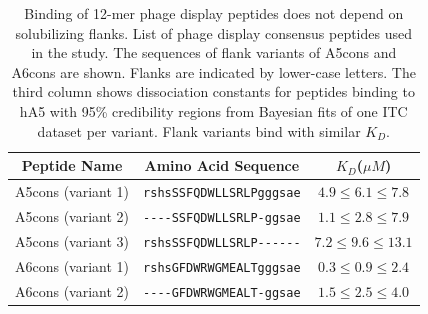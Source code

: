 \begin{table}[h!]\footnotesize
\centering
\caption[Binding of 12-mer phage display peptides
does not depend\newline on solubilizing flanks] {Binding of 12-mer phage display peptides
does not depend on solubilizing flanks. List of phage display consensus
peptides used in the study. The sequences of flank variants of A5cons
and A6cons are shown. Flanks are indicated by lower-case letters.
The third column shows dissociation constants for peptides binding
to hA5 with 95\% credibility regions from Bayesian fits of one ITC
dataset per variant. Flank variants bind with similar $K_{D}$.}


\begin{tabular}{ccc}
Peptide Name & Amino Acid Sequence & $K_{D}$($\mu M$)\tabularnewline
\hline 
A5cons (variant 1) & \texttt{rshsSSFQDWLLSRLPgggsae} & $4.9\le6.1\le7.8$\tabularnewline
A5cons (variant 2) & \texttt{-{}-{}-{}-SSFQDWLLSRLP-ggsae} & $1.1\le2.8\le7.9$\tabularnewline
A5cons (variant 3) & \texttt{rshsSSFQDWLLSRLP-{}-{}-{}-{}-{}-} & $7.2\le9.6\le13.1$\tabularnewline
A6cons (variant 1) & \texttt{rshsGFDWRWGMEALTgggsae} & $0.3\le0.9\le2.4$\tabularnewline
A6cons (variant 2) & \texttt{-{}-{}-{}-GFDWRWGMEALT-ggsae} & $1.5\le2.5\le4.0$\tabularnewline
\end{tabular} 
\end{table}




